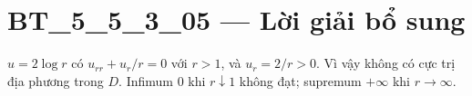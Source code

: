 \documentclass[10pt,a4paper]{article}
\begin{document}
\section*{BT\_5\_5\_3\_05 — Lời giải bổ sung}
$u=2\log r$ có $u_{rr}+u_r/r=0$ với $r>1$, và $u_r=2/r>0$. Vì vậy không có cực trị địa phương trong $D$. Infimum 0 khi $r\downarrow1$ không đạt; supremum $+\infty$ khi $r\to\infty$.
\end{document}

